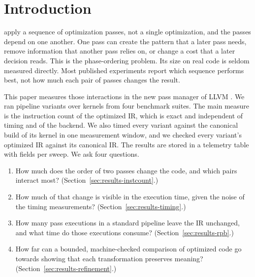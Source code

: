 \section{Introduction}

 apply a sequence of optimization passes, not a single optimization, and the passes depend on one another. One pass can
create the pattern that a later pass needs, remove information that another pass relies on, or change a cost that a later
decision reads. This is the phase-ordering problem. Its size on real code is seldom measured directly. Most published experiments
report which sequence performs best, not how much each pair of passes changes the result.

This paper measures those interactions in the new pass manager of LLVM \cite{lattner2004llvm}. We ran \NumSweeps{} pipeline variants over \NumKernels{}
kernels from four benchmark suites. The main measure is the instruction count of the optimized IR, which is exact and independent
of timing and of the backend. We also timed every variant against the canonical build of its kernel in one measurement window, and
we checked every variant's optimized IR against its canonical IR. The results are stored in a telemetry table with \NumColumns{}
fields per sweep. We ask four questions.

\begin{enumerate}
  \item How much does the order of two passes change the code, and which pairs interact most? (Section~\ref{sec:results-instcount}.)
  \item How much of that change is visible in the execution time, given the noise of the timing measurements? (Section~\ref{sec:results-timing}.)
  \item How many pass executions in a standard pipeline leave the IR unchanged, and what time do those executions consume? (Section~\ref{sec:results-rpb}.)
  \item How far can a bounded, machine-checked comparison of optimized code go towards showing that each transformation preserves
        meaning? (Section~\ref{sec:results-refinement}.)
\end{enumerate}

